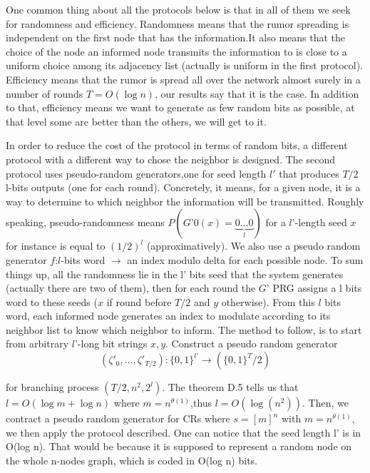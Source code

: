 \documentclass[10pt,journal,a4paper]{IEEEtran}
\begin{document}
One common thing about all  the protocols below is that in all of them we seek for randomness and efficiency. Randomness means that the rumor spreading is independent on the first node that has the information.It also means that the choice of the node an informed node transmits the  information to is close to a uniform choice among its adjacency list (actually is uniform in the first protocol). Efficiency means that the rumor is spread all over the network almost surely in a number of rounds $T=O(\log n)$, our results say that it is the case. In addition to that, efficiency means we want to generate as few random bits as possible, at that level some are better than the others, we will get to it.

In order to reduce the cost of the protocol in terms of random bits, a different protocol with a different way to chose the neighbor is designed. The second protocol uses pseudo-random generators,one for seed length $l'$ that produces $T/2 $ l-bits outputs (one for each round). Concretely, it means, for a given node, it is a way to determine to which neighbor the information will be transmitted. Roughly speaking, pseudo-randomness means $P(G’0(x)=\underbrace{0\dots0}_l)$ for a $l’$-length seed $x$ for instance is equal to $(1/2)^l$ (approximatively). We also use a pseudo random generator $f$:$l$-bits word $\to$ an index modulo delta for each possible node. To sum things up, all the randomness lie in the l’ bits seed that the system generates (actually there are two of them), then for each round the $G’$ PRG assigns a l bits word to these seeds ($x$ if round before $T/2$ and $y$ otherwise). From this $l$ bits word, each informed node generates an index to modulate according to its neighbor list to know which neighbor to inform.
 The method to follow, is to start from arbitrary $l’$-long bit strings $x,y$. Construct a pseudo random generator
  \[
    ( \zeta'_{0}, \dots, \zeta'_{T/2}): \{ 0,1 \}^{l'} \to ( \{0,1\}^T/2 )
   \]
 
for branching process $(T/2,n^2,2^l)$. The theorem D.5 tells us that $l=O(\log m+\log n)$ where $m=n^{\theta(1)}$,thus $l=O(\log(n^2))$. Then, we contract a pseudo random generator for CRs where $s=[m]^n$ with $m=n^{\theta(1)}$, we then apply the protocol described. One can notice that the seed length l’ is in O(log n). That would be because it is supposed to represent a random node on the whole n-nodes graph, which is coded in O(log n) bits.
 
\end{document}

